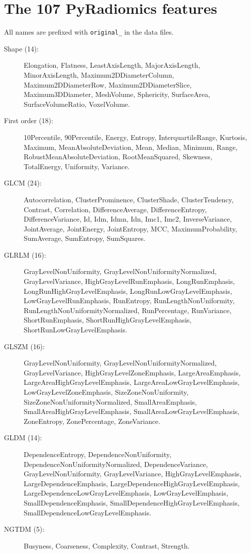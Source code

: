 \documentclass[journal]{IEEEtran}
\newcommand{\code}[1]{\texttt{#1}}
\begin{document}
\section{The 107 PyRadiomics features}
\label{app:features}
\raggedright
All names are prefixed with \code{original\_} in the data files.
\begin{description}
\item[Shape (14):] Elongation, Flatness, LeastAxisLength, MajorAxisLength, MinorAxisLength, Maximum2DDiameterColumn,
  Maximum2DDiameterRow, Maximum2DDiameterSlice, Maximum3DDiameter, MeshVolume, Sphericity, SurfaceArea,
  SurfaceVolumeRatio, VoxelVolume.
\item[First order (18):] 10Percentile, 90Percentile, Energy, Entropy, InterquartileRange, Kurtosis, Maximum,
  MeanAbsoluteDeviation, Mean, Median, Minimum, Range, RobustMeanAbsoluteDeviation, RootMeanSquared, Skewness,
  TotalEnergy, Uniformity, Variance.
\item[GLCM (24):] Autocorrelation, ClusterProminence, ClusterShade, ClusterTendency, Contrast, Correlation,
  DifferenceAverage, DifferenceEntropy, DifferenceVariance, Id, Idm, Idmn, Idn, Imc1, Imc2, InverseVariance,
  JointAverage, JointEnergy, JointEntropy, MCC, MaximumProbability, SumAverage, SumEntropy, SumSquares.
\item[GLRLM (16):] GrayLevelNonUniformity, GrayLevelNonUniformityNormalized, GrayLevelVariance,
  HighGrayLevelRunEmphasis, LongRunEmphasis, LongRunHighGrayLevelEmphasis, LongRunLowGrayLevelEmphasis,
  LowGrayLevelRunEmphasis, RunEntropy, RunLengthNonUniformity, RunLengthNonUniformityNormalized, RunPercentage,
  RunVariance, ShortRunEmphasis, ShortRunHighGrayLevelEmphasis, ShortRunLowGrayLevelEmphasis.
\item[GLSZM (16):] GrayLevelNonUniformity, GrayLevelNonUniformityNormalized, GrayLevelVariance,
  HighGrayLevelZoneEmphasis, LargeAreaEmphasis, LargeAreaHighGrayLevelEmphasis, LargeAreaLowGrayLevelEmphasis,
  LowGrayLevelZoneEmphasis, SizeZoneNonUniformity, SizeZoneNonUniformityNormalized, SmallAreaEmphasis,
  SmallAreaHighGrayLevelEmphasis, SmallAreaLowGrayLevelEmphasis, ZoneEntropy, ZonePercentage, ZoneVariance.
\item[GLDM (14):] DependenceEntropy, DependenceNonUniformity, DependenceNonUniformityNormalized,
  DependenceVariance, GrayLevelNonUniformity, GrayLevelVariance, HighGrayLevelEmphasis, LargeDependenceEmphasis,
  LargeDependenceHighGrayLevelEmphasis, LargeDependenceLowGrayLevelEmphasis, LowGrayLevelEmphasis,
  SmallDependenceEmphasis, SmallDependenceHighGrayLevelEmphasis, SmallDependenceLowGrayLevelEmphasis.
\item[NGTDM (5):] Busyness, Coarseness, Complexity, Contrast, Strength.
\end{description}
\end{document}

